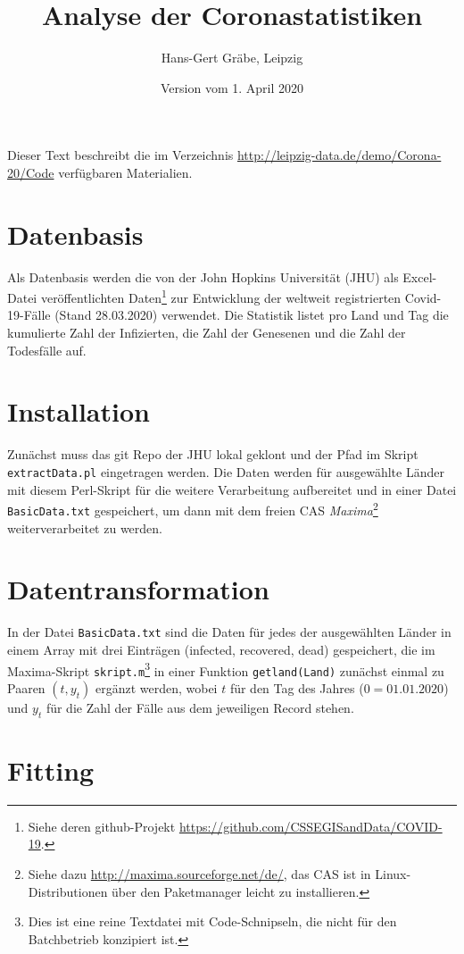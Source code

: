\documentclass[a4paper,11pt]{article}
\title{Analyse der Coronastatistiken}
\author{Hans-Gert Gräbe, Leipzig}
\date{Version vom 1. April 2020}
\begin{document}
\maketitle

Dieser Text beschreibt die im Verzeichnis
\url{http://leipzig-data.de/demo/Corona-20/Code} verfügbaren Materialien.

\section{Datenbasis}

Als Datenbasis werden die von der John Hopkins Universität (JHU) als
Excel-Datei veröffentlichten Daten\footnote{Siehe deren github-Projekt
  \url{https://github.com/CSSEGISandData/COVID-19}.} zur Entwicklung der
weltweit registrierten Covid-19-Fälle (Stand 28.03.2020) verwendet. Die
Statistik listet pro Land und Tag die kumulierte Zahl der Infizierten, die
Zahl der Genesenen und die Zahl der Todesfälle auf.

\section{Installation} 

Zunächst muss das git Repo der JHU lokal geklont und der Pfad im Skript
\texttt{extractData.pl} eingetragen werden.  Die Daten werden für ausgewählte
Länder mit diesem Perl-Skript für die weitere Verarbeitung aufbereitet und in
einer Datei \texttt{BasicData.txt} gespeichert, um dann mit dem freien CAS
\emph{Maxima}\footnote{Siehe dazu \url{http://maxima.sourceforge.net/de/}, das
  CAS ist in Linux-Distributionen über den Paketmanager leicht zu
  installieren.} weiterverarbeitet zu werden.

\section{Datentransformation}

In der Datei \texttt{BasicData.txt} sind die Daten für jedes der ausgewählten
Länder in einem Array mit drei Einträgen (infected, recovered, dead)
gespeichert, die im Maxima-Skript \texttt{skript.m}\footnote{Dies ist eine
  reine Textdatei mit Code-Schnipseln, die nicht für den Batchbetrieb
  konzipiert ist.} in einer Funktion \texttt{getland(Land)} zunächst einmal zu
Paaren $(t,y_t)$ ergänzt werden, wobei $t$ für den Tag des Jahres
($0=01.01.2020$) und $y_t$ für die Zahl der Fälle aus dem jeweiligen Record
stehen.

\section{Fitting}
\end{document}
